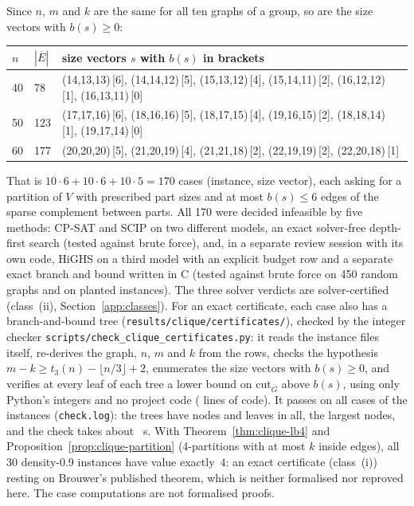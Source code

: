 Since $n$, $m$ and $k$ are the same for all ten graphs of a group, so are the
size vectors with $b(s)\ge 0$:
\begin{center}
\small
\begin{tabular}{lll}
\hline
$n$ & $|\overline E|$ & size vectors $s$ with $b(s)$ in brackets\\
\hline
40 & 78 & (14,13,13)\,[6], (14,14,12)\,[5], (15,13,12)\,[4], (15,14,11)\,[2], (16,12,12)\,[1], (16,13,11)\,[0]\\
50 & 123 & (17,17,16)\,[6], (18,16,16)\,[5], (18,17,15)\,[4], (19,16,15)\,[2], (18,18,14)\,[1], (19,17,14)\,[0]\\
60 & 177 & (20,20,20)\,[5], (21,20,19)\,[4], (21,21,18)\,[2], (22,19,19)\,[2], (22,20,18)\,[1]\\
\hline
\end{tabular}
\end{center}
That is $10\cdot 6+10\cdot 6+10\cdot 5=170$ cases (instance, size vector), each
asking for a partition of $V$ with prescribed part sizes and at most $b(s)\le 6$
edges of the sparse complement between parts. All 170 were decided
infeasible by five methods: CP-SAT\cite{perron2026cpsat} and
SCIP\cite{hojny2025scip} on two different models, an exact
solver-free depth-first search (tested against brute force), and, in a
separate review session with its own code, HiGHS on a third model with an explicit budget row and
a separate exact branch and bound written in C (tested against brute force
on 450 random graphs and on planted instances). The three solver verdicts are
solver-certified (class~(ii), Section~\ref{app:classes}). For an exact
certificate, each case also has a branch-and-bound tree
(\texttt{results/clique/certificates/}), checked by the integer checker
\texttt{scripts/check\_clique\_certificates.py}: it reads the instance files
itself, re-derives the graph, $n$, $m$ and $k$ from the rows, checks the
hypothesis $m-k\ge t_3(n)-\lfloor n/3\rfloor+2$, enumerates the size vectors
with $b(s)\ge 0$, and verifies at every leaf of each tree a lower bound on
$\mathrm{cut}_{\overline G}$ above $b(s)$, using only Python's integers and
no project code (\CliqueCheckerLines{} lines of code). It passes on all
\CliqueCertCases{} cases of the \CliqueCertInstances{} instances
(\texttt{check.log}): the trees have \CliqueCertNodes{} nodes and
\CliqueCertLeaves{} leaves in all, the largest \CliqueCertMaxNodes{} nodes, and
the check takes about \CliqueCertSeconds{}~s. With Theorem~\ref{thm:clique-lb4} and
Proposition~\ref{prop:clique-partition} (4-partitions with at most $k$ inside
edges), all 30 density-0.9 instances have value exactly~$4$: an exact
certificate (class~(i)) resting on Brouwer's published theorem, which is
neither formalised nor reproved here. The case computations are not
formalised proofs.

